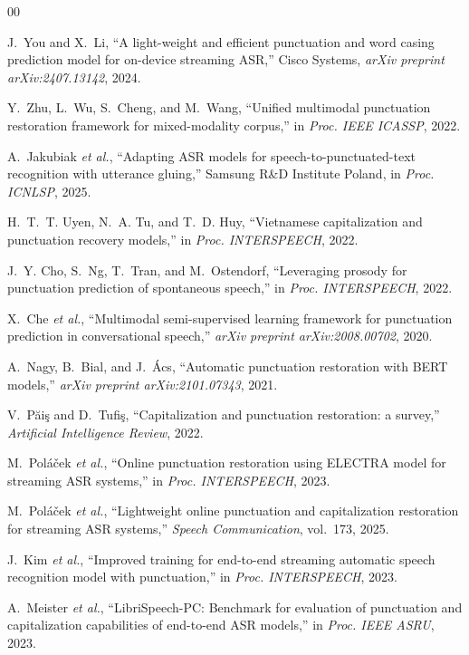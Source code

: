 \documentclass[conference,onecolumn]{IEEEtran}
\begin{document}
\begin{thebibliography}{00}

J.~You and X.~Li, ``A light-weight and efficient punctuation and word casing
prediction model for on-device streaming ASR,'' Cisco Systems, \emph{arXiv
preprint arXiv:2407.13142}, 2024.

Y.~Zhu, L.~Wu, S.~Cheng, and M.~Wang, ``Unified multimodal punctuation
restoration framework for mixed-modality corpus,'' in \emph{Proc. IEEE ICASSP},
2022.

A.~Jakubiak \emph{et al.}, ``Adapting ASR models for speech-to-punctuated-text
recognition with utterance gluing,'' Samsung R\&D Institute Poland, in
\emph{Proc. ICNLSP}, 2025.

H.~T.~T. Uyen, N.~A. Tu, and T.~D. Huy, ``Vietnamese capitalization and
punctuation recovery models,'' in \emph{Proc. INTERSPEECH}, 2022.

J.~Y. Cho, S.~Ng, T.~Tran, and M.~Ostendorf, ``Leveraging prosody for punctuation
prediction of spontaneous speech,'' in \emph{Proc. INTERSPEECH}, 2022.

X.~Che \emph{et al.}, ``Multimodal semi-supervised learning framework for
punctuation prediction in conversational speech,'' \emph{arXiv preprint
arXiv:2008.00702}, 2020.

A.~Nagy, B.~Bial, and J.~\'Acs, ``Automatic punctuation restoration with BERT
models,'' \emph{arXiv preprint arXiv:2101.07343}, 2021.

V.~P\u{a}i\c{s} and D.~Tufi\c{s}, ``Capitalization and punctuation restoration:
a survey,'' \emph{Artificial Intelligence Review}, 2022.

M.~Pol\'a\v{c}ek \emph{et al.}, ``Online punctuation restoration using ELECTRA
model for streaming ASR systems,'' in \emph{Proc. INTERSPEECH}, 2023.

M.~Pol\'a\v{c}ek \emph{et al.}, ``Lightweight online punctuation and
capitalization restoration for streaming ASR systems,'' \emph{Speech
Communication}, vol.~173, 2025.

J.~Kim \emph{et al.}, ``Improved training for end-to-end streaming automatic
speech recognition model with punctuation,'' in \emph{Proc. INTERSPEECH}, 2023.

A.~Meister \emph{et al.}, ``LibriSpeech-PC: Benchmark for evaluation of
punctuation and capitalization capabilities of end-to-end ASR models,'' in
\emph{Proc. IEEE ASRU}, 2023.


\end{thebibliography}
\end{document}
